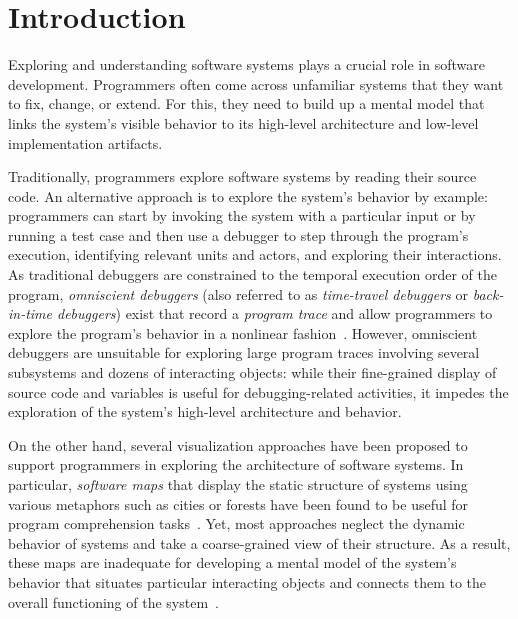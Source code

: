 \section{Introduction}
\label{sec:introduction}

Exploring and understanding software systems plays a crucial role in software development.
Programmers often come across unfamiliar systems that they want to fix, change, or extend.
For this, they need to build up a mental model that links the system's visible behavior to its high-level architecture and low-level implementation artifacts.

Traditionally, programmers explore software systems by reading their source code.
An alternative approach is to explore the system's behavior by example:
programmers can start by invoking the system with a particular input or by running a test case and then use a debugger to step through the program's execution, identifying relevant units and actors, and exploring their interactions.
As traditional debuggers are constrained to the temporal execution order of the program, \emph{omniscient debuggers} (also referred to as \emph{time-travel debuggers} or \emph{back-in-time debuggers}) exist that record a \emph{program trace} and allow programmers to explore the program's behavior in a nonlinear fashion~\cite{lewis2003debugging,hofer2006design,pothier2009back,lienhard2008practical,perscheid2012test}.
However, omniscient debuggers are unsuitable for exploring large program traces involving several subsystems and dozens of interacting objects:
while their fine-grained display of source code and variables is useful for debugging-related activities, it impedes the exploration of the system's high-level architecture and behavior.

On the other hand, several visualization approaches have been proposed to support programmers in exploring the architecture of software systems.
In particular, \emph{software maps} that display the static structure of systems using various metaphors such as cities or forests have been found to be useful for program comprehension tasks~\cite{wettel2007visualizing,atzberger2021softwareforest,limberger2022visual}.
Yet, most approaches neglect the dynamic behavior of systems and take a coarse-grained view of their structure.
As a result, these maps are inadequate for developing a mental model of the system's behavior that situates particular interacting objects and connects them to the overall functioning of the system~\cite{vonMayrhauser1995program}.


